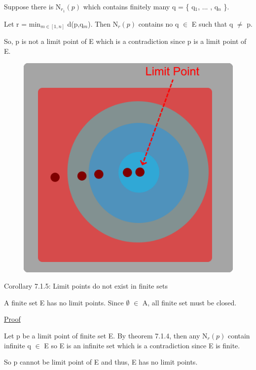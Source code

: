 	Suppose there is N$_{r_1}(p)$ which contains finitely many q = \{ q$_1$, ... , q$_n$ \}.

	Let r = min$_{m \in [1,n]}$ d(p,q$_m$). Then N$_r(p)$ contains no q $\in$ E such that q $\not =$ p.

	So, p is not a limit point of E which is a contradiction since p is a limit point of E.

\begin{figure}[h]
	\centering
	\includegraphics[scale=0.31]{Images/7.1.4.png}
\end{figure}

{ \color{orange} Corollary 7.1.5: Limit points do not exist in finite sets } 
	
	\begin{adjustbox}{minipage=14cm, right, vspace=0.1cm 0cm}
		A finite set E has no limit points.
		Since $\emptyset$ $\in$ A, all finite set must be closed.
	\end{adjustbox}

{ \color{magenta} \underline{Proof} } 

	Let p be a limit point of finite set E. By {\color{red} theorem 7.1.4}, 
	then any N$_r(p)$ contain infinite q $\in$ E so E is an infinite set
	which is a contradiction since E is finite.

	So p cannot be limit point of E and thus, E has no limit points. \\

